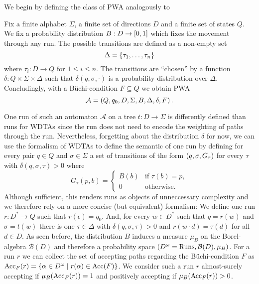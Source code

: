 We begin by defining the class of \ac{PWA} analogously to
\cite[Definition 4.1.1]{RandAutoInfTrees} 
\begin{definition}
  Fix a finite alphabet $\Sigma$, a finite set of directions $D$ and a finite
  set of states $Q$. We fix a probability distribution
  $B:D\rightarrow\left[0,1\right]$ which fixes the movement through any run. The
  possible transitions are defined as a non-empty set
  \begin{equation*}
    \Delta = \left\{ \tau_{1},\dots,\tau_{n} \right\}
  \end{equation*}
  where $\tau_{i}:D\rightarrow Q$ for $1\leq i\leq n$.
  The transitions are \enquote{chosen} by a function 
  $\delta:Q\times\Sigma\times\Delta$ such that
  $\delta(q,\sigma,\cdot)$ is a probability distribution over $\Delta$.
  Concludingly, with a Büchi-condition $F\subseteq Q$ we obtain \ac{PWA}
  \begin{equation*}
    \mathcal{A} = \left(Q, q_{0}, D, \Sigma, B, \Delta, \delta, F\right).
  \end{equation*}
\end{definition}
One run of such an automaton $\mathcal{A}$ on a tree $t:D\rightarrow\Sigma$ is
differently defined than runs for \acp{WDTA} since the run does not need to
encode the weighting of paths through the run. Nevertheless, forgetting about 
the distribution $\delta$ for now, we can use the formalism of \acp{WDTA} to 
define the semantic of one run by defining for every pair $q\in Q$ and 
$\sigma\in\Sigma$ a set of transitions of the form $\left(q,\sigma,G_{\tau}\right)$
for every $\tau$ with $\delta(q,\sigma,\tau)>0$ where
\begin{equation*}
  G_{\tau}(p,b) = \begin{cases}
    B(b)&\text{if }\tau(b) = p,\\
    0&\text{otherwise}.
  \end{cases}
\end{equation*}
Although sufficient, this renders runs as objects of unneccessary complexity 
and we therefore rely on a more concise (but equivalent) formalism:
We define one run $r:D^{*}\rightarrow Q$ such that $r(\epsilon) = q_{0}$. And, 
for every $w\in D^{*}$ such that $q = r(w)$ and $\sigma = t(w)$ there is one
$\tau\in\Delta$ with $\delta(q,\sigma,\tau)>0$ and $r(w\cdot d)=\tau(d)$ 
for all $d\in D$. As seen before, the distribution $B$ induces a measure 
$\mu_{B}$ on the Borel-algebra $\mathcal{B}(D)$ and therefore a probability 
space $\left(D^{\omega} = \operatorname{Runs}, \mathcal{B}(D), \mu_{B}\right)$. For a run $r$ we 
can collect the set of accepting paths regarding the Büchi-condition $F$ as 
$\operatorname{Acc}_{F}(r) = \left\{\alpha\in D^{\omega}\mid r(\alpha)\in \operatorname{Acc}(F)\right\}$. We 
consider such a run $r$ almost-surely accepting if $\mu_{B}(\operatorname{Acc}_{F}(r))=1$ and 
positively accepting if $\mu_{B}(\operatorname{Acc}_{F}(r))>0$.

